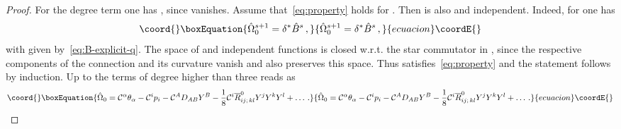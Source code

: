 \documentclass[a4paper,11pt]{amsart}
\numberwithin{thm}{section} %
\numberwithin{equation}{section} %
\numberwithin{figure}{section} %
\providecommand{\qcommut}[2]{[#1,#2]_\star}
\renewcommand{\:}{{\rm\, :\,}}
\def\bar{\overline}
\def\cc{{\mathcal C}}
\def\qA{{\hat{\mathfrak A}}}
\def\con{{\bar\Gamma}}
\begin{document}
\begin{proof}
For the degree \coordHE{} term one has \myHighlight{${\hat\Omega_0}^2=-\cc^i p_i$}\coordHE{},
since \myHighlight{$\qcommut{{\hat\Omega}_0^0}{{\hat\Omega}_0^1}$}\coordHE{} vanishes.
Assume that~\eqref{eq:property} holds for \coordHE{}.  Then
\coordHE{} is also \myHighlight{$\cc^\alpha$}\coordHE{} and
\coordHE{} independent.  Indeed, for \coordHE{} one has
\begin{equation}\coord{}\boxEquation{
{\hat\Omega}_0^{s+1}=\delta^*{\hat B}^s\,, 
}{
{\hat\Omega}_0^{s+1}=\delta^*{\hat B}^s\,, 
}{ecuacion}\coordE{}\end{equation}
with \coordHE{} given by~\eqref{eq:B-explicit-q}. 
The space of \myHighlight{$\cc^\alpha$}\coordHE{} and \coordHE{} independent functions is
closed w.r.t. the star commutator in \myHighlight{$\qA$}\coordHE{}, since the respective
components of the connection \myHighlight{$\con^0$}\coordHE{} and its curvature vanish and
\myHighlight{$\delta^*$}\coordHE{} also preserves this space. Thus \coordHE{}
satisfies~\eqref{eq:property} and the statement follows by
induction.  Up to the terms of degree higher than three
\coordHE{} reads as
\begin{equation}\coord{}\boxEquation{
  \label{eq:3}
{\hat\Omega}_0=\cc^\alpha \theta_\alpha - \cc^i p_i-\cc^A D_{AB}Y^B
-\frac{1}{8} \cc^i {\bar R}^0_{ij;\,kl}Y^jY^kY^l+\ldots\,.
}{
  {\hat\Omega}_0=\cc^\alpha \theta_\alpha - \cc^i p_i-\cc^A D_{AB}Y^B
-\frac{1}{8} \cc^i {\bar R}^0_{ij;\,kl}Y^jY^kY^l+\ldots\,.
}{ecuacion}\coordE{}\end{equation}
\end{proof}
\end{document}
